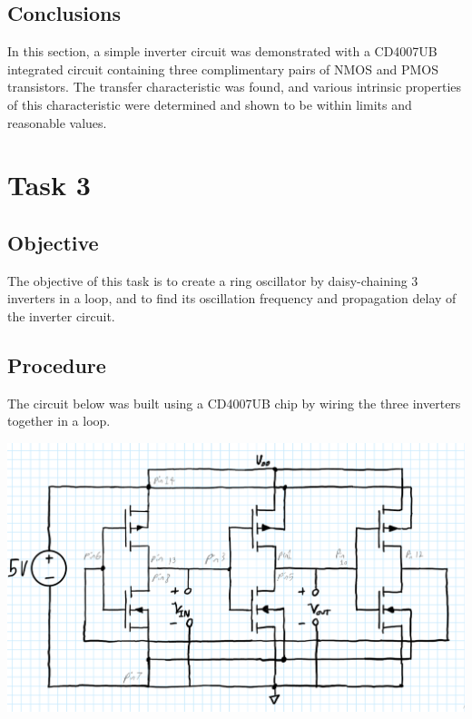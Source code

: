 \documentclass[notitlepage, 12pt]{report}  %
\begin{document}
\subsection*{Conclusions}

\indent\indent In this section, a simple inverter circuit was demonstrated with a CD4007UB integrated circuit containing
three complimentary pairs of NMOS and PMOS transistors. The transfer characteristic was found, and various intrinsic properties 
of this characteristic were determined and shown to be within limits and reasonable values. \\

\newpage

\section*{Task 3}

\subsection*{Objective}
\indent\indent The objective of this task is to create a ring oscillator by daisy-chaining 3 inverters in a loop, 
and to find its oscillation frequency and propagation delay of the inverter circuit.\\

\subsection*{Procedure}

\indent\indent The circuit below was built using a CD4007UB chip by wiring the three inverters together in a loop.\\

\begin{center}
    \includegraphics[scale=0.35]{ringoscillator.png}
\end{center}
\end{document}
